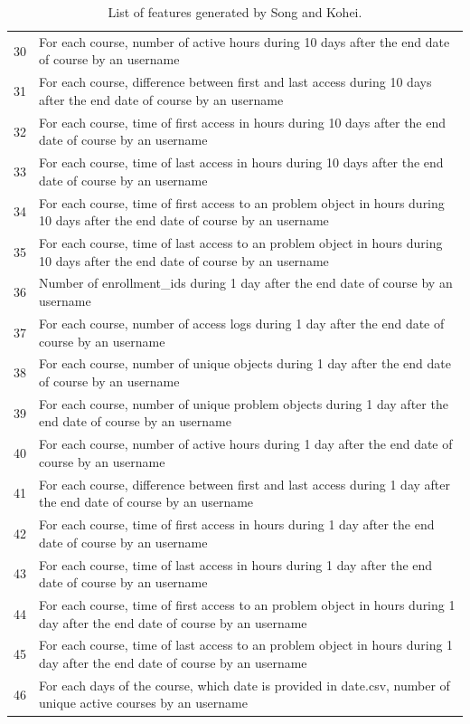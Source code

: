 \begin{center}
\begin{table}[ht]
\begin{minipage}{\textwidth}
{\begin{tabular}{|l|l|}
      30 & For each course, number of active hours during 10 days after the end date of course by an username \tabularnewline
      31 & For each course, difference between first and last access during 10 days after the end date of course by an username \tabularnewline
      32 & For each course, time of first access in hours during 10 days after the end date of course by an username \tabularnewline
      33 & For each course, time of last access in hours during 10 days after the end date of course by an username \tabularnewline
      34 & For each course, time of first access to an problem object in hours during 10 days after the end date of course by an username \tabularnewline
      35 & For each course, time of last access to an problem object in hours during 10 days after the end date of course by an username \tabularnewline
      36 & Number of enrollment\_ids during 1 day after the end date of course by an username \tabularnewline
      37 & For each course, number of access logs during 1 day after the end date of course by an username \tabularnewline
      38 & For each course, number of unique objects during 1 day after the end date of course by an username \tabularnewline
      39 & For each course, number of unique problem objects during 1 day after the end date of course by an username \tabularnewline
      40 & For each course, number of active hours during 1 day after the end date of course by an username \tabularnewline
      41 & For each course, difference between first and last access during 1 day after the end date of course by an username \tabularnewline
      42 & For each course, time of first access in hours during 1 day after the end date of course by an username \tabularnewline
      43 & For each course, time of last access in hours during 1 day after the end date of course by an username \tabularnewline
      44 & For each course, time of first access to an problem object in hours during 1 day after the end date of course by an username \tabularnewline
      45 & For each course, time of last access to an problem object in hours during 1 day after the end date of course by an username \tabularnewline
      46 & For each days of the course, which date is provided in date.csv, number of unique active courses by an username \tabularnewline
      \hline
      \end{tabular}
    }
    \hfill{}
    \caption{List of features generated by Song and Kohei.}
    \label{tb:skfeature}
    \end{minipage}
  \end{table}
\end{center}

